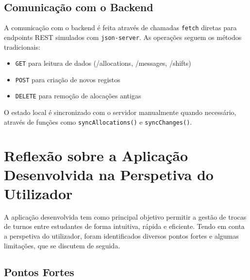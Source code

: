 \documentclass{article}
\begin{document}
\subsection{Comunicação com o Backend}
A comunicação com o backend é feita através de chamadas \texttt{fetch} diretas para endpoints REST simulados com \texttt{json-server}. As operações seguem os métodos tradicionais:

\begin{itemize}
    \item \texttt{GET} para leitura de dados (/allocations, /messages, /shifts)
    \item \texttt{POST} para criação de novos registos
    \item \texttt{DELETE} para remoção de alocações antigas
\end{itemize}

O estado local é sincronizado com o servidor manualmente quando necessário, através de funções como \texttt{syncAllocations()} e \texttt{syncChanges()}.

\newpage
\section{Reflexão sobre a Aplicação Desenvolvida na Perspetiva do Utilizador}

A aplicação desenvolvida tem como principal objetivo permitir a gestão de trocas de turnos entre estudantes de forma intuitiva, rápida e eficiente. Tendo em conta a perspetiva do utilizador, foram identificados diversos pontos fortes e algumas limitações, que se discutem de seguida.

\subsection{Pontos Fortes}
\end{document}
